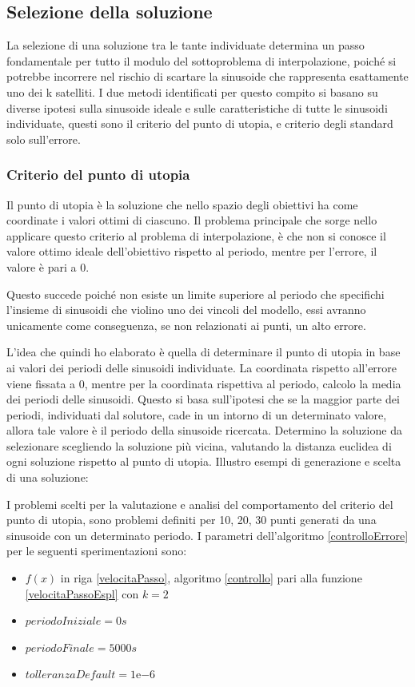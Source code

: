 \documentclass[a4paper,12pt]{report}
\newcommand{\expnumber}[2]{{#1}\mathrm{e}{#2}}
\begin{document}
\subsection{Selezione della soluzione}
\label{ss:sel_sol}
La selezione di una soluzione tra le tante individuate determina un passo fondamentale per tutto il modulo del sottoproblema di interpolazione, poiché si potrebbe incorrere nel rischio di scartare la sinusoide che rappresenta esattamente uno dei k satelliti. I due metodi identificati per questo compito si basano su diverse ipotesi sulla sinusoide ideale e sulle caratteristiche di tutte le sinusoidi individuate, questi sono il criterio del punto di utopia, e criterio degli standard solo sull'errore.

\subsubsection{Criterio del punto di utopia}
\label{ss:utopia}
Il punto di utopia è la soluzione che nello spazio degli obiettivi ha come coordinate i valori ottimi di ciascuno. Il problema principale che sorge nello applicare questo criterio al problema di interpolazione, è che non si conosce il valore ottimo ideale dell'obiettivo rispetto al periodo, mentre per l'errore, il valore è pari a 0.

Questo succede poiché non esiste un limite superiore al periodo che specifichi l'insieme di sinusoidi che violino uno dei vincoli del modello, essi avranno unicamente come conseguenza, se non relazionati ai punti, un alto errore.

L'idea che quindi ho elaborato è quella di determinare il punto di utopia in base ai valori dei periodi delle sinusoidi individuate. La coordinata rispetto all'errore viene fissata a 0, mentre per la coordinata rispettiva al periodo, calcolo la media dei periodi delle sinusoidi. Questo si basa sull'ipotesi che se la maggior parte dei periodi, individuati dal solutore, cade in un intorno di un determinato valore, allora tale valore è il periodo della sinusoide ricercata. Determino la soluzione da selezionare scegliendo la soluzione più vicina, valutando la distanza euclidea di ogni soluzione rispetto al punto di utopia. Illustro esempi di generazione e scelta di una soluzione:

I problemi scelti per la valutazione e analisi del comportamento del criterio del punto di utopia, sono problemi definiti per 10, 20, 30 punti generati da una sinusoide con un determinato periodo.
I parametri dell'algoritmo \ref{controlloErrore} per le seguenti sperimentazioni sono:
\begin{itemize}
  \item $f(x)$ in riga \ref{velocitaPasso}, algoritmo \ref{controllo} pari alla funzione \eqref{velocitaPassoEspl} con $k = 2$
  \item $periodoIniziale = 0s$
  \item $periodoFinale = 5000s$
  \item $tolleranzaDefault = \expnumber{1}{-6}$
\end{itemize}
\end{document}
